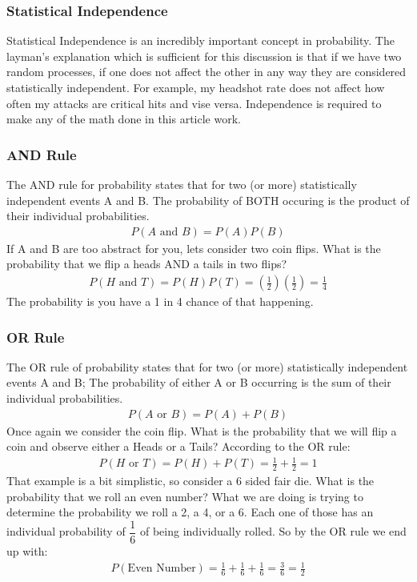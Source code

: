 \documentclass{article}
\begin{document}
\subsubsection{Statistical Independence}

Statistical Independence is an incredibly important concept in probability. The layman's explanation which is sufficient for this discussion is that if we have two random processes, if one does not affect the other in any way they are considered statistically independent. For example, my headshot rate does not affect how often my attacks are critical hits and vise versa. Independence is required to make any of the math done in this article work.

\subsubsection{AND Rule}

The AND rule for probability states that for two (or more) statistically independent events A and B. The probability of BOTH occuring is the product of their individual probabilities.
\begin{align*}
P(A \text{ and } B) = P(A)P(B)
\end{align*}
If A and B are too abstract for you, lets consider two coin flips. What is the probability that we flip a heads AND a tails in two flips?
\begin{align*}
P(H \text{ and } T) = P(H)P(T) = (\tfrac{1}{2})(\tfrac{1}{2}) = \frac{1}{4}
\end{align*}
The probability is you have a 1 in 4 chance of that happening.

\subsubsection{OR Rule}

The OR rule of probability states that for two (or more) statistically independent events A and B; The probability of either A or B occurring is the sum of their individual probabilities.
\begin{align*}
P(A \text{ or } B) = P(A)+P(B)
\end{align*}
Once again we consider the coin flip. What is the probability that we will flip a coin and observe either a Heads or a Tails? According to the OR rule:
\begin{align*}
P(H \text{ or } T) = P(H)+P(T) = \tfrac{1}{2}+\tfrac{1}{2} = 1
\end{align*}
That example is a bit simplistic, so consider a 6 sided fair die. What is the probability that we roll an even number? What we are doing is trying to determine the probability we roll a 2, a 4, or a 6. Each one of those has an individual probability of $\dfrac{1}{6}$ of being individually rolled. So by the OR rule we end up with:
\begin{align*}
P(\text{Even Number}) = \tfrac{1}{6}+\tfrac{1}{6}+\tfrac{1}{6} = \tfrac{3}{6} = \tfrac{1}{2}
\end{align*}
\end{document}
